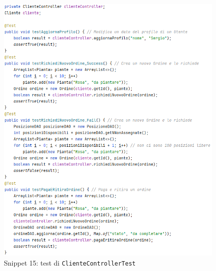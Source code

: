 \documentclass{article}
\newcommand{\code}[1]{\texttt{#1}}
\begin{document}
\begin{figure}[H]
    \centering
    \includegraphics[scale=0.5]{resources/images/Snippets/snippet_ClienteControllerTest.png}
    \captionsetup{labelformat=empty,labelsep=none}
    \caption{Snippet 15: test di \code{ClienteControllerTest}}
    \label{fig:snippet_ClienteControllerTest}
\end{figure}
\end{document}
